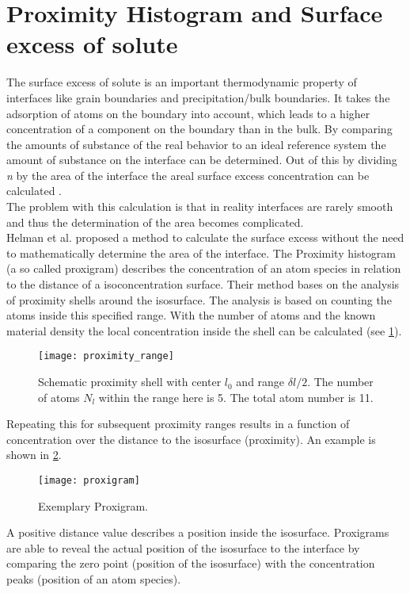 \section{Proximity Histogram and Surface excess of solute }
\label{proxigrams and seos}


The surface excess of solute \cite{Gib61} is an important thermodynamic property of interfaces like grain boundaries and precipitation/bulk boundaries. It takes the adsorption of atoms on the boundary into account, which leads to a higher concentration of a component on the boundary than in the bulk. By comparing the amounts of substance of the real behavior to an ideal reference system the amount of substance on the interface can be determined. Out of this by dividing \emph{n} by the area of the interface the areal surface excess concentration can be calculated \cite{Mit08}.\\

The problem with this calculation is that in reality interfaces are rarely smooth and thus the determination of the area becomes complicated.\\

Helman et al. \cite{Hel02a} proposed a method to calculate the surface excess without the need to mathematically determine the area of the interface.
The Proximity histogram (a so called proxigram) describes the  concentration of an atom species in relation to the distance of a isoconcentration surface.  Their method bases on the analysis of proximity shells around the isosurface. The analysis is based on counting the atoms inside this specified range. With the number of atoms and the known material density the local concentration inside the shell can be calculated (see \cref{fig:pg1}).

\begin{figure}[H]
	\centering
	\texttt{[image: proximity\_range]}
	\caption{Schematic proximity shell with center $l_0$ and range $\delta l/2$. The number of atoms $N_l$ within the range here is 5. The total atom number is 11. \label{fig:pg1}}
\end{figure}

Repeating this for subsequent proximity ranges results in a function of concentration over the distance to the isosurface (proximity). An example is shown in \cref{fig:pg2}.

\begin{figure}[H]
	\centering
	\texttt{[image: proxigram]}
	\caption{Exemplary Proxigram. \label{fig:pg2}}
\end{figure}

A positive distance value describes a position inside the isosurface. Proxigrams are able to reveal the actual position of the isosurface to the interface by comparing the zero point (position of the isosurface) with the concentration peaks (position of an atom species).


